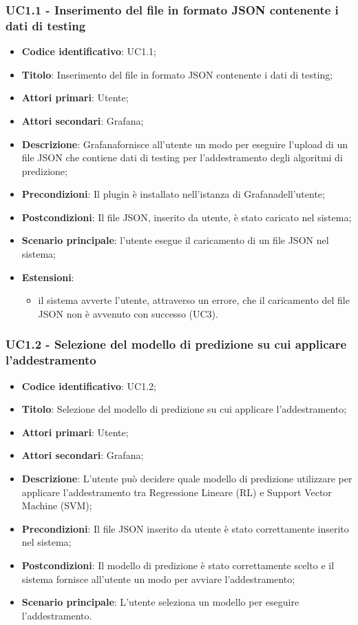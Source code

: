 \subsubsection{UC1.1 - Inserimento del file in formato JSON contenente i dati di testing}
\begin{itemize}
	\item \textbf{Codice identificativo}: UC1.1;
	\item \textbf{Titolo}: Inserimento del file in formato JSON contenente i dati di testing;
	\item \textbf{Attori primari}: Utente;
	\item \textbf{Attori secondari}: Grafana\glo;
	\item \textbf{Descrizione}: Grafana\glosp fornisce all'utente un modo per eseguire l'upload di un file JSON che contiene dati di testing per l'addestramento degli algoritmi di predizione;
	\item \textbf{Precondizioni}: Il plugin è installato nell'istanza di Grafana\glosp dell'utente;
	\item \textbf{Postcondizioni}: Il file JSON, inserito da utente, è stato caricato nel sistema;
	\item \textbf{Scenario principale}: l'utente esegue il caricamento di un file JSON nel sistema;
	\item \textbf{Estensioni}:
		\begin{itemize}
			\item il sistema avverte l'utente, attraverso un errore, che il caricamento del file JSON non è avvenuto con successo (UC3).
		\end{itemize}
\end{itemize}

\subsubsection{UC1.2 - Selezione del modello di predizione su cui applicare l'addestramento}
\begin{itemize}
	\item \textbf{Codice identificativo}: UC1.2;
	\item \textbf{Titolo}: Selezione del modello di predizione su cui applicare l'addestramento;
	\item \textbf{Attori primari}: Utente;
	\item \textbf{Attori secondari}: Grafana\glo;
	\item \textbf{Descrizione}: L'utente può decidere quale modello di predizione utilizzare per applicare l'addestramento tra Regressione Lineare (RL\glo) e Support Vector Machine (SVM\glo);
	\item \textbf{Precondizioni}: Il file JSON inserito da utente è stato correttamente inserito nel sistema;
	\item \textbf{Postcondizioni}: Il modello di predizione è stato correttamente scelto e il sistema fornisce all'utente un modo per avviare l'addestramento;
	\item \textbf{Scenario principale}: L'utente seleziona un modello per eseguire l'addestramento.
\end{itemize}

